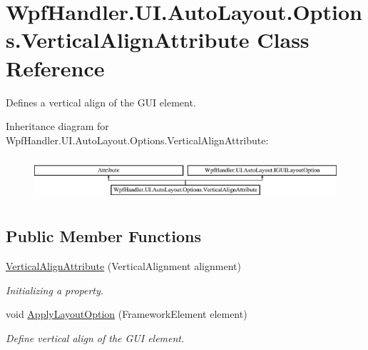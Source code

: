\hypertarget{class_wpf_handler_1_1_u_i_1_1_auto_layout_1_1_options_1_1_vertical_align_attribute}{}\section{Wpf\+Handler.\+U\+I.\+Auto\+Layout.\+Options.\+Vertical\+Align\+Attribute Class Reference}
\label{class_wpf_handler_1_1_u_i_1_1_auto_layout_1_1_options_1_1_vertical_align_attribute}


Defines a vertical align of the G\+UI element.  


Inheritance diagram for Wpf\+Handler.\+U\+I.\+Auto\+Layout.\+Options.\+Vertical\+Align\+Attribute\+:\begin{figure}[H]
\begin{center}
\leavevmode
\includegraphics[height=1.642229cm]{d6/db9/class_wpf_handler_1_1_u_i_1_1_auto_layout_1_1_options_1_1_vertical_align_attribute}
\end{center}
\end{figure}
\subsection*{Public Member Functions}
\begin{DoxyCompactItemize}
\item 
\mbox{\hyperlink{class_wpf_handler_1_1_u_i_1_1_auto_layout_1_1_options_1_1_vertical_align_attribute_a3551a6479b74c809c75c208d49967ce0}{Vertical\+Align\+Attribute}} (Vertical\+Alignment alignment)
\begin{DoxyCompactList}\small\item\em Initializing a property. \end{DoxyCompactList}\item 
void \mbox{\hyperlink{class_wpf_handler_1_1_u_i_1_1_auto_layout_1_1_options_1_1_vertical_align_attribute_a5a37e0bcf32b49da94e4f4d539fe810c}{Apply\+Layout\+Option}} (Framework\+Element element)
\begin{DoxyCompactList}\small\item\em Define vertical align of the G\+UI element. \end{DoxyCompactList}\end{DoxyCompactItemize}
